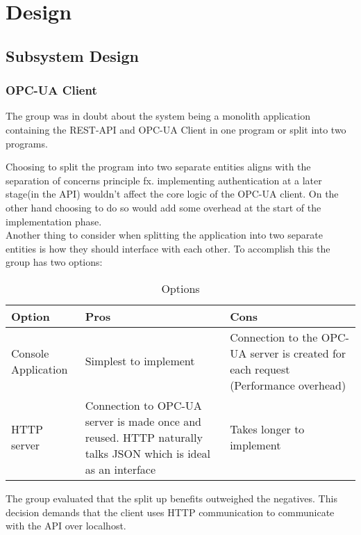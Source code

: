 \section{Design}
\subsection{Subsystem Design}
\subsubsection{OPC-UA Client}
The group was in doubt about the system being a monolith application containing 
the REST-API and OPC-UA Client in one program or split into two programs.

Choosing to split the program into two separate entities aligns with the 
separation of concerns principle fx. implementing authentication at a later 
stage(in the API) wouldn't affect the core logic of the OPC-UA client. On the 
other hand choosing to do so would add some overhead at the start of the 
implementation phase. \\

Another thing to consider when splitting the application into two separate 
entities is how they should interface with each other. To accomplish this the 
group has two options: 

\begin{table}[ht]
    \begin{tabularx}{\textwidth}{|>{\RaggedRight}X|>{\RaggedRight}X|>{\RaggedRight}X|}
        \hline
        \textbf{Option} & \textbf{Pros} & \textbf{Cons} \\
        \hline
        Console Application & Simplest to implement & Connection to the OPC-UA 
        server is created for each request (Performance overhead)\\
        \hline
        HTTP server & Connection to OPC-UA server is made once and reused. HTTP
        naturally talks JSON which is ideal as an interface & Takes longer to 
        implement \\
        \hline
    \end{tabularx}
    \caption{Options}
    \label{someLabel}
\end{table}

The group evaluated that the split up benefits outweighed the negatives. This 
decision demands that the client uses HTTP communication to communicate with the
API over localhost. 

